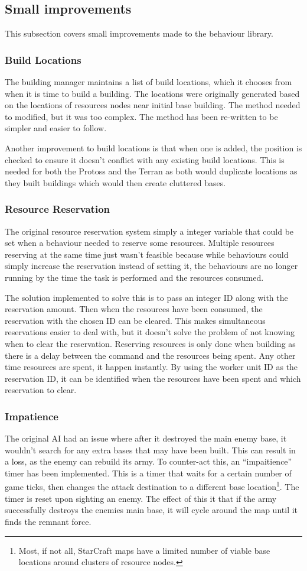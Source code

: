 \documentclass[11pt,openright,a4paper]{report}
\begin{document}
\subsection{Small improvements}
This subsection covers small improvements made to the behaviour library.
\subsubsection{Build Locations}
The building manager maintains a list of build locations, which it chooses from when it is time to build a building. The locations were originally generated based on the locations of resources nodes near initial base building. The method needed to modified, but it was too complex. The method has been re-written to be simpler and easier to follow.

Another improvement to build locations is that when one is added, the position is checked to ensure it doesn't conflict with any existing build locations. This is needed for both the Protoss and the Terran as both would duplicate locations as they built buildings which would then create cluttered bases.
\subsubsection{Resource Reservation}
The original resource reservation system simply a integer variable that could be set when a behaviour needed to reserve some resources. Multiple resources reserving at the same time just wasn't feasible because while behaviours could simply increase the reservation instead of setting it, the behaviours are no longer running by the time the task is performed and the resources consumed.

The solution implemented to solve this is to pass an integer ID along with the reservation amount. Then when the resources have been consumed, the reservation with the chosen ID can be cleared. This makes simultaneous reservations easier to deal with, but it doesn't solve the problem of not knowing when to clear the reservation. Reserving resources is only done when building as there is a delay between the command and the resources being spent. Any other time resources are spent, it happen instantly. By using the worker unit ID as the reservation ID, it can be identified when the resources have been spent and which reservation to clear.
\subsubsection{Impatience}
The original AI had an issue where after it destroyed the main enemy base, it wouldn't search for any extra bases that may have been built. This can result in a loss, as the enemy can rebuild its army. To counter-act this, an ``impaitience'' timer has been implemented. This is a timer that waits for a certain number of game ticks, then changes the attack destination to a different base location\footnote{Most, if not all, StarCraft maps have a limited number of viable base locations around clusters of resource nodes.}. The timer is reset upon sighting an enemy. The effect of this it that if the army successfully destroys the enemies main base, it will cycle around the map until it finds the remnant force.
\end{document}
